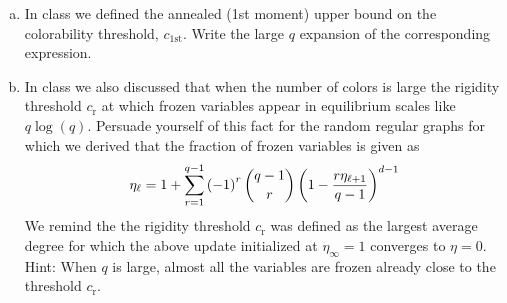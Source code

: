 \documentclass[a4paper,oneside,12pt]{article}
\begin{document}
\begin{enumerate}[(a)]
\item 
        In class we defined the annealed (1st moment) upper bound on the colorability threshold, $ c_{\mathrm{1st}} $.
        Write the large $q$ expansion of the corresponding expression. 
\item 
        In class we also discussed that when the number of colors is large the rigidity threshold $ c_{\mathrm{r}} $ at which frozen variables appear in equilibrium scales like $ q \log(q) $.
        Persuade yourself of this fact for the random regular graphs for which we derived that the fraction of frozen variables is given as 
        \begin{equation*}
            \eta_\ell = 1 + \sum_{r=1}^{q-1} \left(  -1  \right)^r \binom{q-1}{r} \left(  1 - \frac{ r \eta_{\ell+1} }{q-1}  \right)^{d-1}
        \end{equation*}
        We remind the the rigidity threshold $ c_{\mathrm{r}} $ was defined as the largest average degree for which the above update initialized at $ \eta_\infty = 1 $ converges to $ \eta = 0 $.
        Hint: When $ q $ is large, almost all the variables are frozen already close to the threshold $ c_{\mathrm{r}} $. 
\end{enumerate}
\end{document}
